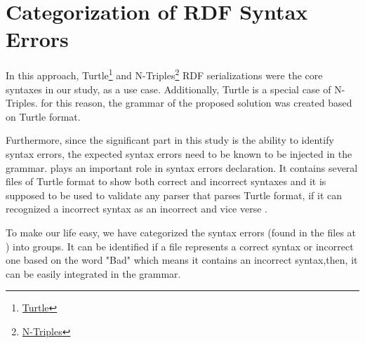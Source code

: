 \section{Categorization of RDF Syntax Errors}
 In this approach, Turtle\footnote{\href{https://www.w3.org/TR/turtle/}{Turtle}} and N-Triples\footnote{\href{https://www.w3.org/TR/n-triples/}{N-Triples}} RDF serializations were the core syntaxes in our study, as a use case. Additionally, Turtle is a special case of N-Triples. for this reason, the grammar of the proposed solution was created based on Turtle format. 
 
 Furthermore, since the significant part in this study is the ability to identify syntax errors, the expected syntax errors need to be known to be injected in the grammar. \cite{TurtleTests:Online} plays an important role in syntax errors declaration. It contains several files of Turtle format to show both correct and incorrect syntaxes and it is supposed to be used to validate any parser that parses Turtle format, if it can recognized a incorrect syntax as an incorrect and vice verse . 
 
 To make our life easy, we have categorized the syntax errors (found in the files at \cite{TurtleTests:Online}) into groups. It can be identified if a file represents a correct syntax or incorrect one based on the word "Bad" which means it contains an incorrect syntax,then, it can be easily integrated in the grammar.  
 


